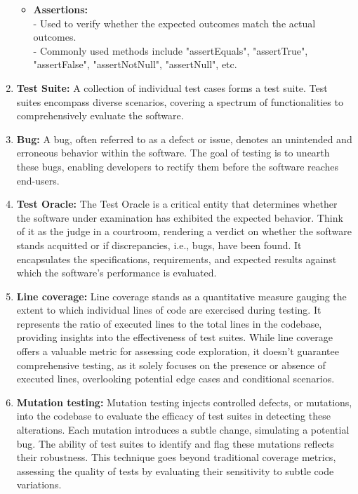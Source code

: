 \begin{enumerate}
\begin{itemize}
        \item \textbf{Assertions:} \\
        - Used to verify whether the expected outcomes match the actual outcomes. \\
        - Commonly used methods\cite{noauthor_assert_nodate} include "assertEquals", "assertTrue", "assertFalse", "assertNotNull", "assertNull", etc.
    \end{itemize}
  
  \item \textbf{Test Suite:} A collection of individual test cases forms a test suite. Test suites encompass diverse scenarios, covering a spectrum of functionalities to comprehensively evaluate the software.
  \item \textbf{Bug:} A bug, often referred to as a defect or issue, denotes an unintended and erroneous behavior within the software. The goal of testing is to unearth these bugs, enabling developers to rectify them before the software reaches end-users.
  \item \textbf{Test Oracle:} The Test Oracle is a critical entity that determines whether the software under examination 
  has exhibited the expected behavior. Think of it as the judge in a courtroom, rendering a verdict on whether the software stands acquitted or if discrepancies, i.e., bugs, have been found. It encapsulates the specifications, requirements, and expected results against which the software's performance is evaluated.
  \item \textbf{Line coverage:} Line coverage stands as a quantitative measure gauging the extent to which individual lines of code are exercised during testing. It represents the ratio of executed lines to the total lines in the codebase, providing insights into the effectiveness of test suites. While line coverage offers a valuable metric for assessing code exploration, it doesn't guarantee comprehensive testing, as it solely focuses on the presence or absence of executed lines, overlooking potential edge cases and conditional scenarios.
  \item \textbf{Mutation testing:} Mutation testing injects controlled defects, or mutations, into the codebase to evaluate the efficacy of test suites in detecting these alterations. Each mutation introduces a subtle change, simulating a potential bug. The ability of test suites to identify and flag these mutations reflects their robustness. This technique goes beyond traditional coverage metrics, assessing the quality of tests by evaluating their sensitivity to subtle code variations.

\end{enumerate}
